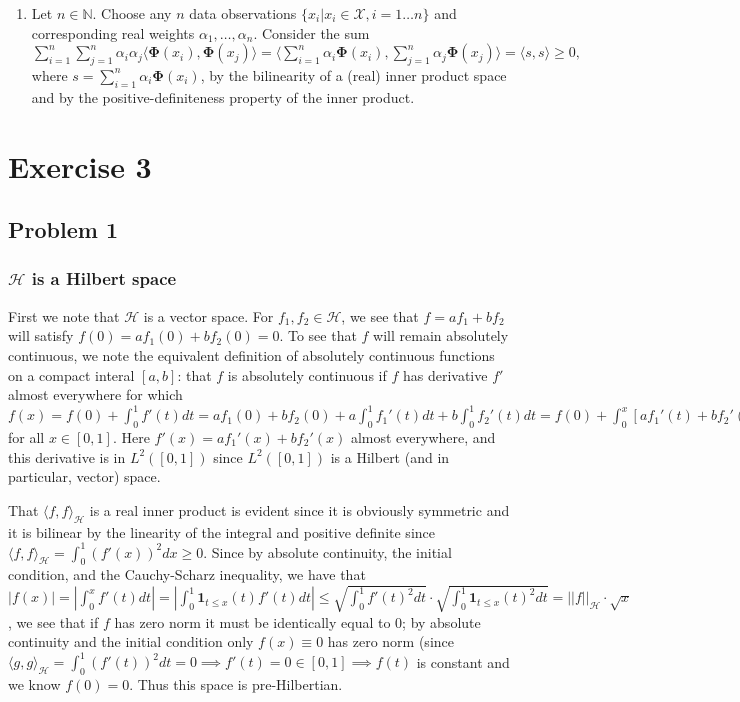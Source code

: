 \documentclass[12pt]{article}
\newenvironment{exercise}[2][Exercise]{\begin{trivlist}
\item[\hskip \labelsep {\bfseries #1}\hskip \labelsep {\bfseries #2.}]}{\end{trivlist}}
\begin{document}
\begin{exercise}{2}
\begin{enumerate}
		\item Let $n \in \mathbb{N}$. Choose any $n$ data observations $\{x_i | x_i \in \mathcal{X}, i=1\ldots n\}$ and corresponding real weights $\alpha_1, \ldots, \alpha_n$. Consider the sum $\sum_{i=1}^n \sum_{j=1}^n \alpha_i \alpha_j \langle \mathbf{\Phi}(x_i), \mathbf{\Phi}(x_j) \rangle = \langle \sum_{i=1}^n \alpha_i \mathbf{\Phi}(x_i), \sum_{j=1}^n \alpha_j \mathbf{\Phi}(x_j) \rangle = \langle s, s \rangle \geq 0,$ where $s=\sum_{i=1}^n \alpha_i \mathbf{\Phi}(x_i)$, by the bilinearity of a (real) inner product space and by the positive-definiteness property of the inner product.
	\end{enumerate}

\end{exercise}

\section{Exercise 3}
\subsection{Problem 1}  
\subsubsection{$\mathcal{H}$ is a Hilbert space} First we note that $\mathcal{H}$ is a vector space. For $f_1, f_2 \in \mathcal{H}$, we see that $f = af_1 + bf_2$ will satisfy $f(0) = af_1(0)+bf_2(0) = 0$. To see that $f$ will remain absolutely continuous, we note the equivalent definition of absolutely continuous functions on a compact interal $[a,b]$: that $f$ is absolutely continuous if $f$ has derivative $f'$ almost everywhere for which $f(x) = f(0) + \int_0^1 f'(t) dt = af_1(0)+bf_2(0) + a \int_0^1 f_1'(t) dt + b \int_0^1 f_2'(t) dt = f(0) + \int_0^x [af_1'(t) + bf_2'(t)] dt$ for all $x \in [0,1]$. Here $f'(x) = af_1'(x) + bf_2'(x)$ almost everywhere, and this derivative is in $L^2([0,1])$ since $L^2([0,1])$ is a Hilbert (and in particular, vector) space.

That $\langle f, f \rangle_{\mathcal{H}}$ is a real inner product is evident since it is obviously symmetric and it is bilinear by the linearity of the integral and positive definite since $\langle f, f \rangle_{\mathcal{H}} = \int_{0}^1 (f'(x))^2 dx \geq 0$. Since by absolute continuity, the initial condition, and the Cauchy-Scharz inequality, we have that $|f(x)| = |\int_0^x f'(t)dt| = |\int_0^1 \mathbf{1}_{t\leq x}(t) f'(t) dt| \leq \sqrt{\int_0^1 f'(t)^2 dt} \cdot \sqrt{\int_0^1 \mathbf{1}_{t \leq x}(t)^2 dt}= ||f||_{\mathcal{H}} \cdot \sqrt{x}$, we see that if $f$ has zero norm it must be identically equal to 0; by absolute continuity and the initial condition only $f(x) \equiv 0$ has zero norm (since $\langle g, g \rangle_\mathcal{H} = \int_0^1 (f'(t))^2 dt = 0 \implies f'(t) = 0 \in [0,1] \implies f(t)$ is constant and we know $f(0) = 0$. Thus this space is pre-Hilbertian.
\end{document}

